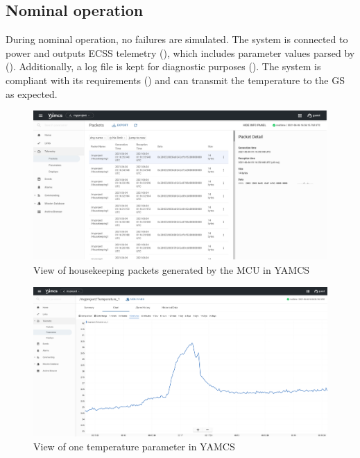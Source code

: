 \documentclass[a4paper,nobib,final]{tufte-book}
\begin{document}
\subsection{Nominal operation}

During nominal operation, no failures are simulated. The system is connected to power and outputs \acs{ECSS} telemetry (), which includes parameter values parsed by (). Additionally, a log file is kept for diagnostic purposes (). The system is compliant with its requirements () and can transmit the temperature to the \acl{GS} as expected.

\begin{figure}
	\centering
	\includegraphics{media/screenshots/yamcs_housekeeping}
	\caption{View of housekeeping packets generated by the \acs{MCU} in \acs{YAMCS}}
	\label{fig:yamcshousekeeping}
\end{figure}

\begin{figure}[h]
	\centering
	\includegraphics{media/screenshots/yamcs_parameter}
	\caption{View of one temperature parameter in \acs{YAMCS}}
	\label{fig:yamcsparameter}
\end{figure}
\end{document}
